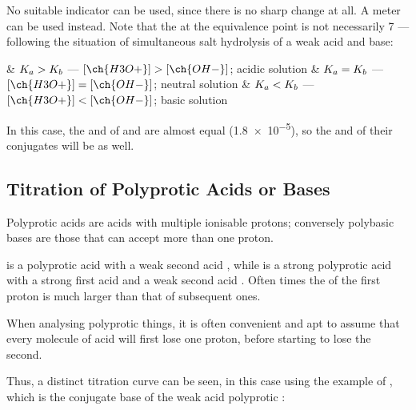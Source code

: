 			No suitable indicator can be used, since there is no sharp \pH{} change at all. A \pH{} meter can be used instead. Note that
			the \pH{} at the equivalence point is not necessarily 7 --- following the situation of simultaneous salt hydrolysis of
			a weak acid and base:

			\begin{bulletlist}
				& $K_{a} > K_{b}$ \hspace{4mm} --- \hspace{4mm} $[\ch{H3O+}] > [\ch{OH-}]$;\hspace{4mm} acidic solution
				& $K_{a} = K_{b}$ \hspace{4mm} --- \hspace{4mm} $[\ch{H3O+}] = [\ch{OH-}]$;\hspace{4mm} neutral solution
				& $K_{a} < K_{b}$ \hspace{4mm} --- \hspace{4mm} $[\ch{H3O+}] < [\ch{OH-}]$;\hspace{4mm} basic solution
			\end{bulletlist}

			In this case, the \Ka{} and \Kb{} of  and  are almost equal (\SI{1.8e-5}{\molarConc}), so
			the \Kb{} and \Ka{} of their conjugates will be as well.












		\pagebreak
		\subsection{Titration of Polyprotic Acids or Bases}

			Polyprotic acids are acids with multiple ionisable protons; conversely polybasic bases are those that can accept more than one
			proton.

			 is a polyprotic acid with a weak second acid , while  is a strong polyprotic acid with a strong
			first acid and a weak second acid . Often times the \Ka{} of the first proton is much larger than that of subsequent ones.

			When analysing polyprotic things, it is often convenient and apt to assume that every molecule of acid will first lose one proton,
			before starting to lose the second.

			Thus, a distinct titration curve can be seen, in this case using the example of , which is the conjugate base of
			the weak acid polyprotic :

